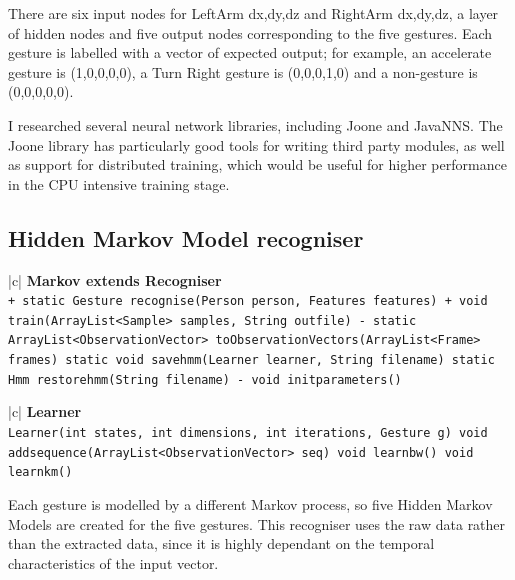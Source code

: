 \documentclass[12pt,a4,notitlepage]{report}
\renewcommand{\_}{\texttt{\symbol{95}}}
\newcommand{\<}{\texttt{\symbol{60}}}
\renewcommand{\>}{\texttt{\symbol{62}}}
\newcommand{\class}[1]{\textbf{#1}}
\newcommand{\variable}[1]{\texttt{#1}}
\begin{document}
{There are six input nodes for LeftArm {dx,dy,dz} and RightArm {dx,dy,dz}, a layer of hidden nodes and five output nodes corresponding to the five gestures. Each gesture is labelled with a vector of expected output; for example, an accelerate gesture is (1,0,0,0,0), a Turn Right gesture is (0,0,0,1,0) and a non-gesture is (0,0,0,0,0).

I researched several neural network libraries, including Joone and JavaNNS. The Joone library has particularly good tools for writing third party modules, as well as support for distributed training, which would be useful for higher performance in the CPU intensive training stage.

\newpage

\subsection{Hidden Markov Model recogniser}

\begin{tabular}{|c|} \hline 
\class{Markov extends Recogniser} \\ \hline
{}
{ \variable{+ static Gesture recognise(Person person, Features features) \newline
+ void train(ArrayList<Sample> samples, String out\_file) \newline
- static ArrayList<ObservationVector> toObservationVectors(ArrayList<Frame> frames) \newline
static void save\_hmm(Learner learner, String filename) \newline
static Hmm restore\_hmm(String filename) \newline
- void init\_parameters()
} } \\ \hline
\end{tabular}

\begin{tabular}{|c|} \hline 
\class{Learner} \\ \hline
{}
{ \variable{Learner(int states, int dimensions, int iterations, Gesture g) \newline
void add\_sequence(ArrayList<ObservationVector> seq) \newline
void learnbw() \newline
void learnkm()
} } \\ \hline
\end{tabular}


Each gesture is modelled by a different Markov process, so five Hidden Markov Models are created for the five gestures. This recogniser uses the raw data rather than the extracted data, since it is highly dependant on the temporal characteristics of the input vector.

}
\end{document}
